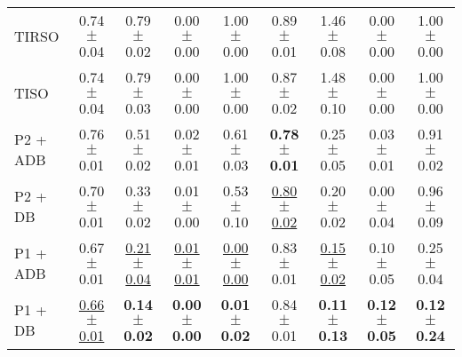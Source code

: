 \begin{table*}[t]
\begin{tabular}{@{}l|c!{\hspace{.5em}}c!{\hspace{.5em}}c!{\hspace{.5em}}c!{\hspace{.5em}}|c!{\hspace{.5em}}c!{\hspace{.5em}}c!{\hspace{.5em}}c@{}}
TIRSO & 0.74{\scriptsize$\pm$0.04} & 0.79{\scriptsize$\pm$0.02} & 0.00{\scriptsize$\pm$0.00} & 1.00{\scriptsize$\pm$0.00} & 0.89{\scriptsize$\pm$0.01} & 1.46{\scriptsize$\pm$0.08} & 0.00{\scriptsize$\pm$0.00} & 1.00{\scriptsize$\pm$0.00} \\
TISO & 0.74{\scriptsize$\pm$0.04} & 0.79{\scriptsize$\pm$0.03} & 0.00{\scriptsize$\pm$0.00} & 1.00{\scriptsize$\pm$0.00} & 0.87{\scriptsize$\pm$0.02} & 1.48{\scriptsize$\pm$0.10} & 0.00{\scriptsize$\pm$0.00} & 1.00{\scriptsize$\pm$0.00} \\
P2 + ADB & 0.76{\scriptsize$\pm$0.01} & 0.51{\scriptsize$\pm$0.02} & 0.02{\scriptsize$\pm$0.01} & 0.61{\scriptsize$\pm$0.03} & \textbf{0.78{\scriptsize$\pm$0.01}} & 0.25{\scriptsize$\pm$0.05} & 0.03{\scriptsize$\pm$0.01} & 0.91{\scriptsize$\pm$0.02} \\
P2 + DB & 0.70{\scriptsize$\pm$0.01} & 0.33{\scriptsize$\pm$0.02} & 0.01{\scriptsize$\pm$0.00} & 0.53{\scriptsize$\pm$0.10} & \underline{0.80{\scriptsize$\pm$0.02}} & 0.20{\scriptsize$\pm$0.02} & 0.00{\scriptsize$\pm$0.04} & 0.96{\scriptsize$\pm$0.09} \\
P1 + ADB & 0.67{\scriptsize$\pm$0.01} & \underline{0.21{\scriptsize$\pm$0.04}} & \underline{0.01{\scriptsize$\pm$0.01}} & \underline{0.00{\scriptsize$\pm$0.00}} & 0.83{\scriptsize$\pm$0.01} & \underline{0.15{\scriptsize$\pm$0.02}} & 0.10{\scriptsize$\pm$0.05} & 0.25{\scriptsize$\pm$0.04} \\
P1 + DB & \underline{0.66{\scriptsize$\pm$0.01}} & \textbf{0.14{\scriptsize$\pm$0.02}} & \textbf{0.00{\scriptsize$\pm$0.00}} & \textbf{0.01{\scriptsize$\pm$0.02}} & 0.84{\scriptsize$\pm$0.01} & \textbf{0.11{\scriptsize$\pm$0.13}} & \textbf{0.12{\scriptsize$\pm$0.05}} & \textbf{0.12{\scriptsize$\pm$0.24}} \\
\midrule[0.3pt]\toprule[1pt]
\end{tabular}
\end{table*}